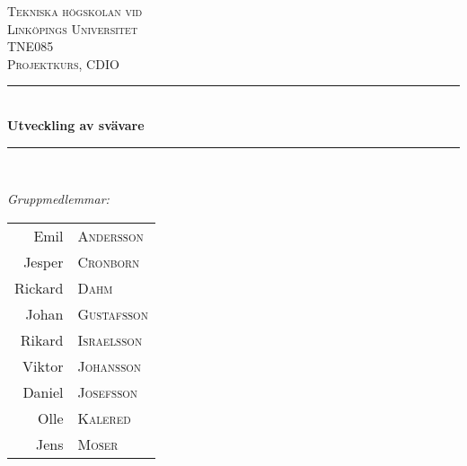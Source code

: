 \begin{titlepage}

\newcommand{\HRule}{\rule{\linewidth}{0.5mm}} %

\center %
 

\textsc{\LARGE Tekniska högskolan vid \\Linköpings Universitet}\\[1.5cm] %
\textsc{\Large TNE085}\\[0.5cm] %
\textsc{\large Projektkurs, CDIO}\\[0.5cm] %


\HRule \\[0.4cm]
{ \huge \bfseries Utveckling av svävare}\\[0.4cm] %
\HRule \\[1.5cm]
 

\begin{minipage}[t]{0.45\textwidth}
\begin{flushleft} \large

\emph{Gruppmedlemmar:}\\
\setlength{\tabcolsep}{2pt}
\begin{tabular}[]{rl}
Emil & \textsc{Andersson} \\
Jesper &\textsc{Cronborn} \\
Rickard & \textsc{Dahm} \\
Johan & \textsc{Gustafsson} \\
Rikard & \textsc{Israelsson} \\
Viktor & \textsc{Johansson} \\
Daniel & \textsc{Josefsson} \\
Olle & \textsc{Kalered} \\
Jens & \textsc{Moser}
\end{tabular}


\end{flushleft}
\end{minipage}
\end{titlepage}
